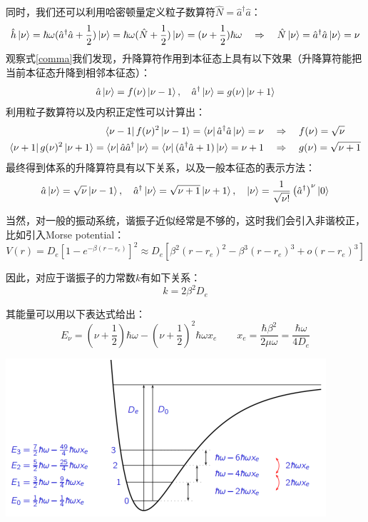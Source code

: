 同时，我们还可以利用哈密顿量定义粒子数算符$\hat{N}=\hat{a}^{\dagger}\hat{a}$：
\[\hat{h}\ket{\nu}=\hbar\omega(\hat{a}^{\dagger}\hat{a}+\frac{1}{2})\ket{\nu}=\hbar\omega(\hat{N}+\frac{1}{2})\ket{\nu}=(\nu+\frac{1}{2})\hbar\omega \quad \Rightarrow \quad \hat{N}\ket{\nu}=\hat{a}^{\dagger}\hat{a}\ket{\nu}=\nu\]
观察式\ref{comma}我们发现，升降算符作用到本征态上具有以下效果（升降算符能把当前本征态升降到相邻本征态）：
\[\hat{a}\ket{\nu}=f(\nu)\ket{\nu-1}, \quad \hat{a}^{\dagger}\ket{\nu}=g(\nu)\ket{\nu+1}\]
利用粒子数算符以及内积正定性可以计算出：
\[\begin{aligned}
\bra{\nu-1}f(\nu)^2\ket{\nu-1}=\bra{\nu}\hat{a}^{\dagger}\hat{a}\ket{\nu}=\nu \quad &\Rightarrow \quad f(\nu)=\sqrt{\nu}\\
\bra{\nu+1}g(\nu)^2\ket{\nu+1}=\bra{\nu}\hat{a}\hat{a}^{\dagger}\ket{\nu}=\bra{\nu}(\hat{a}^{\dagger}\hat{a}+1)\ket{\nu}=\nu+1 \quad &\Rightarrow \quad g(\nu)=\sqrt{\nu+1}\\
\end{aligned}\]
最终得到体系的升降算符具有以下关系，以及一般本征态的表示方法：
\[\hat{a}\ket{\nu}=\sqrt{\nu}\ket{\nu-1}, \quad \hat{a}^{\dagger}\ket{\nu}=\sqrt{\nu+1}\ket{\nu+1}, \quad \ket{\nu}=\frac{1}{\sqrt{\nu!}}\left(\hat{a}^{\dagger}\right)^{\nu}\ket{0}\]

当然，对一般的振动系统，谐振子近似经常是不够的，这时我们会引入非谐校正，比如引入Morse potential：
\[V(r)=D_e\left[1-e^{-\beta(r-r_e)}\right]^2 \approx D_e\left[\beta^2(r-r_e)^2-\beta^3(r-r_e)^3+o(r-r_e)^3\right]\]

因此，对应于谐振子的力常数$k$有如下关系：
\[k=2\beta^2D_e\]

其能量可以用以下表达式给出：
\[E_\nu=\left(\nu+\frac{1}{2}\right)\hbar\omega-\left(\nu+\frac{1}{2}\right)^2\hbar\omega x_e \qquad x_e=\frac{\hbar\beta^2}{2\mu\omega}=\frac{\hbar\omega}{4D_e}\]

\begin{center}
    \includegraphics[scale=0.8]{fig/lzhx/微信图片_20211104112141.png}
\end{center}

